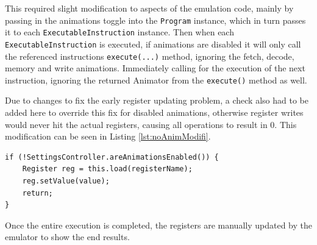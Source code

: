 This required slight modification to aspects of the emulation code, mainly by passing in the animations toggle into the \texttt{Program} instance, which in turn passes it to each \texttt{ExecutableInstruction} instance. Then when each \newline \texttt{ExecutableInstruction} is executed, if animations are disabled it will only call the referenced instructions \verb|execute(...)| method, ignoring the fetch, decode, memory and write animations. Immediately calling for the execution of the next instruction, ignoring the returned Animator from the \verb|execute()| method as well.

Due to changes to fix the early register updating problem, a check also had to be added here to override this fix for disabled animations, otherwise register writes would never hit the actual registers, causing all operations to result in 0. This modification can be seen in Listing \ref{lst:noAnimModifi}.

\begin{lstlisting}[caption={Modification to register \texttt{write(...)} for instance writing when animations are disabled}, label=lst:noAnimModifi]
if (!SettingsController.areAnimationsEnabled()) {
    Register reg = this.load(registerName);
    reg.setValue(value);
    return;
}
\end{lstlisting}

Once the entire execution is completed, the registers are manually updated by the emulator to show the end results.
